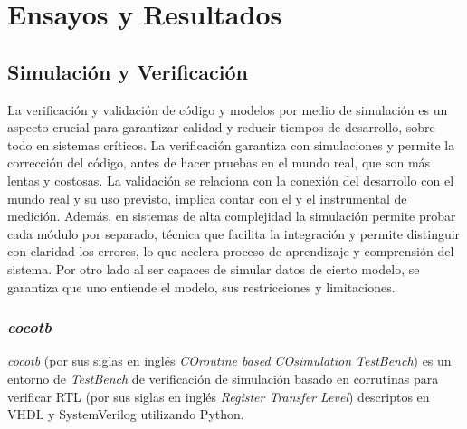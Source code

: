 \chapter{Ensayos y Resultados}\label{Chapter4}


\section{Simulación y Verificación}

La verificación y validación de código y modelos por medio de simulación es
un aspecto crucial para garantizar calidad y reducir tiempos de desarrollo,
sobre todo en sistemas críticos. La verificación garantiza con simulaciones y
permite la corrección del código, antes de hacer pruebas en el mundo real, que
son más lentas y costosas. La validación se relaciona con la conexión del
desarrollo con el mundo real y su uso previsto, implica contar con el
 y el instrumental de medición. Además, en sistemas de alta
complejidad la simulación permite probar cada módulo por separado, técnica que
facilita la integración y permite distinguir con claridad los errores, lo que
acelera proceso de aprendizaje y comprensión del sistema. Por otro lado al ser
capaces de simular datos de cierto modelo, se garantiza que uno entiende el
modelo, sus restricciones y limitaciones.


\subsection{\textit{cocotb}}
\textit{cocotb} (por sus siglas en inglés \textit{COroutine based COsimulation
TestBench}) es un entorno de \textit{TestBench} de verificación de simulación
basado en corrutinas para verificar RTL (por sus siglas en inglés
\textit{Register Transfer Level}) descriptos en VHDL y SystemVerilog utilizando
Python.

